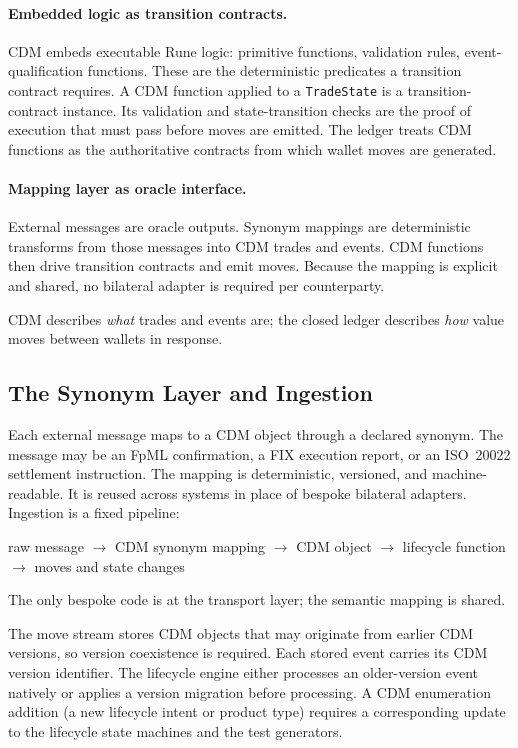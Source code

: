 \paragraph{Embedded logic as transition contracts.} CDM embeds executable Rune logic: primitive functions, validation rules, event-qualification functions. These are the deterministic predicates a transition contract requires. A CDM function applied to a \texttt{TradeState} is a transition-contract instance. Its validation and state-transition checks are the proof of execution that must pass before moves are emitted. The ledger treats CDM functions as the authoritative contracts from which wallet moves are generated.

\paragraph{Mapping layer as oracle interface.} External messages are oracle outputs. Synonym mappings are deterministic transforms from those messages into CDM trades and events. CDM functions then drive transition contracts and emit moves. Because the mapping is explicit and shared, no bilateral adapter is required per counterparty.

CDM describes \textit{what} trades and events are; the closed ledger describes \textit{how} value moves between wallets in response.

\subsection{The Synonym Layer and Ingestion}

Each external message maps to a CDM object through a declared synonym. The message may be an FpML confirmation, a FIX execution report, or an ISO~20022 settlement instruction. The mapping is deterministic, versioned, and machine-readable. It is reused across systems in place of bespoke bilateral adapters. Ingestion is a fixed pipeline:

\begin{center}
raw message $\to$ CDM synonym mapping $\to$ CDM object $\to$ lifecycle function $\to$ moves and state changes
\end{center}

The only bespoke code is at the transport layer; the semantic mapping is shared.

The move stream stores CDM objects that may originate from earlier CDM versions, so version coexistence is required. Each stored event carries its CDM version identifier. The lifecycle engine either processes an older-version event natively or applies a version migration before processing. A CDM enumeration addition (a new lifecycle intent or product type) requires a corresponding update to the lifecycle state machines and the test generators.

